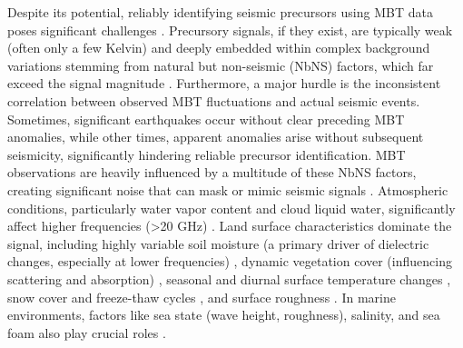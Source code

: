 \documentclass[fleqn,10pt]{wlscirep_mdpi_style}
\begin{document}
Despite its potential, reliably identifying seismic precursors using MBT data poses significant challenges \cite{wuGEOSSbasedThermalParameters2012,lixinProgressesPossibleFrontiers2022}. Precursory signals, if they exist, are typically weak (often only a few Kelvin) \cite{maedaDiscriminationLocalFaint2008,maTwostepMethodExtract2011,jingLandAtmosphereMeteorological2019} and deeply embedded within complex background variations stemming from natural but non-seismic (NbNS) factors, which far exceed the signal magnitude \cite{qiSpatiotemporallyWeightedTwostep2020,maedaDiscriminationLocalFaint2008,maTwostepMethodExtract2011,lixinProgressesPossibleFrontiers2022,jingLandAtmosphereMeteorological2019}. Furthermore, a major hurdle is the inconsistent correlation between observed MBT fluctuations and actual seismic events. Sometimes, significant earthquakes occur without clear preceding MBT anomalies, while other times, apparent anomalies arise without subsequent seismicity, significantly hindering reliable precursor identification. MBT observations are heavily influenced by a multitude of these NbNS factors, creating significant noise that can mask or mimic seismic signals \cite{wuGEOSSbasedThermalParameters2012,maedaDiscriminationLocalFaint2008,qiCharacteristicBackgroundMicrowave2023}. Atmospheric conditions, particularly water vapor content and cloud liquid water, significantly affect higher frequencies (>20 GHz) \cite{wuGEOSSbasedThermalParameters2012,carverMicrowaveRemoteSensing1985}. Land surface characteristics dominate the signal, including highly variable soil moisture (a primary driver of dielectric changes, especially at lower frequencies) \cite{wuGEOSSbasedThermalParameters2012,carverMicrowaveRemoteSensing1985,njokuRetrievalLandSurface1999,oweMethodologySurfaceSoil2001}, dynamic vegetation cover (influencing scattering and absorption) \cite{wuGEOSSbasedThermalParameters2012,carverMicrowaveRemoteSensing1985,maedaDiscriminationLocalFaint2008,qiCharacteristicBackgroundMicrowave2023}, seasonal and diurnal surface temperature changes \cite{qiSpatiotemporallyWeightedTwostep2020,guptaMicrowaveEmissionScattering2014}, snow cover and freeze-thaw cycles \cite{guptaMicrowaveEmissionScattering2014,maedaDiscriminationLocalFaint2008}, and surface roughness \cite{carverMicrowaveRemoteSensing1985,freundTimeresolvedStudyCharge,guptaMicrowaveEmissionScattering2014,jeongDeepLearningBased2024}. In marine environments, factors like sea state (wave height, roughness), salinity, and sea foam also play crucial roles \cite{carverMicrowaveRemoteSensing1985,guptaMicrowaveEmissionScattering2014,liuGeneralFeaturesMultiparameter2023}.
\end{document}
